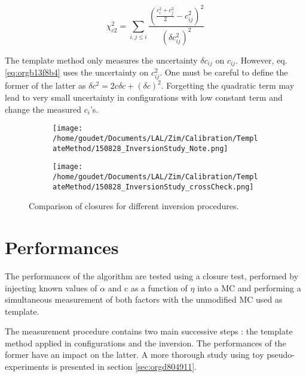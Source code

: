 \begin{equation}
\label{eq:orgb13f8b4}
\chi_{c2}^2 = \sum \limits_{i, j\leq i} \frac{ (\frac{c_i^2 + c_j^2}{2} - c_{ij}^2)^2 }{(\delta c_{ij}^2)^2}
\end{equation}

The template method only measures the uncertainty $\delta c_{ij}$ on $c_{ij}$.
However, eq. \ref{eq:orgb13f8b4} uses the uncertainty on $c_{ij}^2$.
One must be careful to define the former of the latter as $\delta c^2 = 2c\delta c + (\delta c)^2$.
Forgetting the quadratic term may lead to very small uncertainty in configurations with low constant term and change the measured $c_i$'s.

\begin{figure}
\begin{subfigure}[t]{0.49\linewidth}
\begin{center}
\texttt{[image: /home/goudet/Documents/LAL/Zim/Calibration/TemplateMethod/150828\_InversionStudy\_Note.png]}
\end{center}
\end{subfigure}
\begin{subfigure}[t]{0.49\linewidth}
\begin{center}
\texttt{[image: /home/goudet/Documents/LAL/Zim/Calibration/TemplateMethod/150828\_InversionStudy\_crossCheck.png]}
\end{center}
\end{subfigure}
\caption{\label{orgac9241c}
Comparison of closures for different inversion procedures.}
\end{figure}




\section{Performances}
\label{sec:orgf66efee}
\label{sec:Calibration_inSitu_TempPerf}

The performances of the algorithm are tested using a closure test, performed by injecting known values of \(\alpha\) and c as a function of $\eta$ into a MC and performing a simultaneous measurement of both factors with the unmodified MC used as template.

The measurement procedure contains two main successive steps : the template method applied in configurations and the inversion.
The performances of the former have an impact on the latter.
A more thorough study using toy pseudo-experiments is presented in section \ref{sec:orgd804911}.

